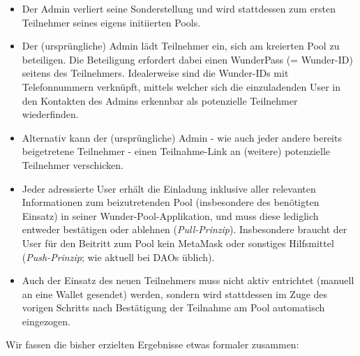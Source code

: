 \begin{itemize}
	\item Der Admin verliert seine Sonderstellung und wird stattdessen zum ersten Teilnehmer seines eigens initiierten Pools. 
	\item Der (ursprüngliche) Admin lädt Teilnehmer ein, sich am kreierten Pool zu beteiligen. Die Beteiligung erfordert dabei einen WunderPass (= Wunder-ID) seitens des Teilnehmers. Idealerweise sind die Wunder-IDs mit Telefonnummern verknüpft, mittels welcher sich die einzuladenden User in den Kontakten des Admins erkennbar als potenzielle Teilnehmer wiederfinden.
	\item Alternativ kann der (ursprüngliche) Admin - wie auch jeder andere bereits beigetretene Teilnehmer - einen Teilnahme-Link an (weitere) potenzielle Teilnehmer verschicken.
	\item Jeder adressierte User erhält die Einladung inklusive aller relevanten Informationen zum beizutretenden Pool (insbesondere des benötigten Einsatz) in seiner Wunder-Pool-Applikation, und muss diese lediglich entweder bestätigen oder ablehnen (\textit{Pull-Prinzip}). Insbesondere braucht der User für den Beitritt zum Pool kein MetaMask oder sonstiges Hilfsmittel (\textit{Push-Prinzip}; wie aktuell bei DAOs üblich). 
	\item Auch der Einsatz des neuen Teilnehmers muss nicht aktiv entrichtet (manuell an eine Wallet gesendet) werden, sondern wird stattdessen im Zuge des vorigen Schritts nach Bestätigung der Teilnahme am Pool automatisch eingezogen.
\end{itemize}

\vspace{0.2cm}

Wir fassen die bisher erzielten Ergebnisse etwas formaler zusammen:

\vspace{0.2cm}

